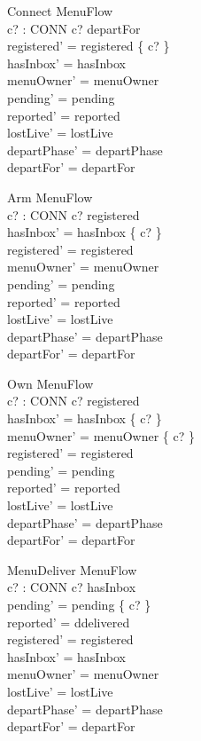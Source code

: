 \documentclass[a4paper,10pt,fleqn]{article}
\begin{document}
\begin{schema}{Connect}
  \Delta MenuFlow \\
  c? : CONN
\where
  c? \notin departFor \\
  registered' = registered \cup \{ c? \} \\
  hasInbox' = hasInbox \\
  menuOwner' = menuOwner \\
  pending' = pending \\
  reported' = reported \\
  lostLive' = lostLive \\
  departPhase' = departPhase \\
  departFor' = departFor
\end{schema}

\begin{schema}{Arm}
  \Delta MenuFlow \\
  c? : CONN
\where
  c? \in registered \\
  hasInbox' = hasInbox \cup \{ c? \} \\
  registered' = registered \\
  menuOwner' = menuOwner \\
  pending' = pending \\
  reported' = reported \\
  lostLive' = lostLive \\
  departPhase' = departPhase \\
  departFor' = departFor
\end{schema}

\begin{schema}{Own}
  \Delta MenuFlow \\
  c? : CONN
\where
  c? \in registered \\
  hasInbox' = hasInbox \cup \{ c? \} \\
  menuOwner' = menuOwner \cup \{ c? \} \\
  registered' = registered \\
  pending' = pending \\
  reported' = reported \\
  lostLive' = lostLive \\
  departPhase' = departPhase \\
  departFor' = departFor
\end{schema}

\begin{schema}{MenuDeliver}
  \Delta MenuFlow \\
  c? : CONN
\where
  c? \in hasInbox \\
  pending' = pending \cup \{ c? \} \\
  reported' = ddelivered \\
  registered' = registered \\
  hasInbox' = hasInbox \\
  menuOwner' = menuOwner \\
  lostLive' = lostLive \\
  departPhase' = departPhase \\
  departFor' = departFor
\end{schema}
\end{document}
